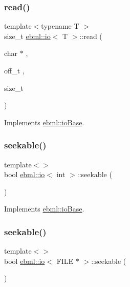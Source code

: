\subsubsection{\texorpdfstring{read()}{read()}\hspace{0.1cm}{\footnotesize\ttfamily [2/2]}}
{\footnotesize\ttfamily template$<$typename T $>$ \\
size\+\_\+t \mbox{\hyperlink{classebml_1_1io}{ebml\+::io}}$<$ T $>$\+::read (\begin{DoxyParamCaption}\item[{char $\ast$}]{,  }\item[{off\+\_\+t}]{,  }\item[{size\+\_\+t}]{ }\end{DoxyParamCaption})\hspace{0.3cm}{\ttfamily [virtual]}}



Implements \mbox{\hyperlink{classebml_1_1ioBase_aba93b64f19016207b3d6c43183a2be07}{ebml\+::io\+Base}}.

\mbox{\label{classebml_1_1io_a6e97c1e6868bf65286328b9447eaa419}} 
\subsubsection{\texorpdfstring{seekable()}{seekable()}\hspace{0.1cm}{\footnotesize\ttfamily [1/3]}}
{\footnotesize\ttfamily template$<$$>$ \\
bool \mbox{\hyperlink{classebml_1_1io}{ebml\+::io}}$<$ int $>$\+::seekable (\begin{DoxyParamCaption}{ }\end{DoxyParamCaption})\hspace{0.3cm}{\ttfamily [virtual]}}



Implements \mbox{\hyperlink{classebml_1_1ioBase_a413541f633f97d68021cbf58837e1970}{ebml\+::io\+Base}}.

\mbox{\label{classebml_1_1io_a4ea6caf18c5646646b3a15bc3c59a5ab}} 
\subsubsection{\texorpdfstring{seekable()}{seekable()}\hspace{0.1cm}{\footnotesize\ttfamily [2/3]}}
{\footnotesize\ttfamily template$<$$>$ \\
bool \mbox{\hyperlink{classebml_1_1io}{ebml\+::io}}$<$ F\+I\+LE $\ast$ $>$\+::seekable (\begin{DoxyParamCaption}{ }\end{DoxyParamCaption})\hspace{0.3cm}{\ttfamily [virtual]}}



